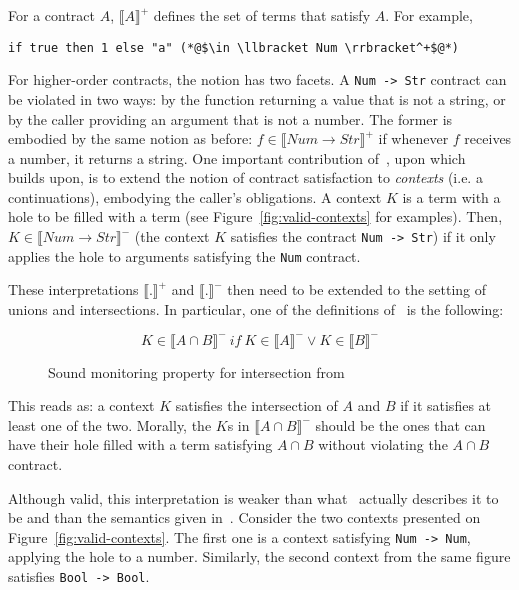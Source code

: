 \documentclass[sigplan,10pt,review,anonymous]{acmart}
\newcommand{\nickel}[1]{\lstinline[language=nickel]{#1}}
\begin{document}
For a contract $A$, $\llbracket A \rrbracket^+$ defines the set of terms that
satisfy $A$. For example,

\begin{lstlisting}[language=nickel,frame=none,numbers=none]
    if true then 1 else "a" (*@$\in \llbracket Num \rrbracket^+$@*)
\end{lstlisting}

For higher-order contracts, the notion has two facets. A \nickel{Num -> Str}
contract can be violated in two ways: by the function returning a value that is
not a string, or by the caller providing an argument that is not a number.  The
former is embodied by the same notion as before: $f \in \llbracket Num \to Str
\rrbracket^+$ if whenever $f$ receives a number, it returns a string.  One
important contribution of~\cite{KeilThiemannUnionIntersection}, upon
which~\cite{RootCauseOfBlame} builds upon, is to extend the notion of contract
satisfaction to \emph{contexts} (i.e. a continuations), embodying the caller's
obligations. A context $K$ is a term with a hole to be filled with a term (see
Figure~\ref{fig:valid-contexts} for examples). Then, $K \in \llbracket Num \to
Str \rrbracket^-$ (the context $K$ satisfies the contract \nickel{Num -> Str})
if it only applies the hole to arguments satisfying the \nickel{Num} contract.

These interpretations $\llbracket . \rrbracket^+$ and $\llbracket .
\rrbracket^-$ then need to be extended to the setting of unions and
intersections. In particular, one of the definitions of~\cite{RootCauseOfBlame}
is the following:

\begin{figure}[h]
$$ K \in \llbracket A \cap B \rrbracket^-~if~K \in \llbracket A \rrbracket^- \lor K \in \llbracket B \rrbracket^- $$
\caption{Sound monitoring property for intersection from~\cite{RootCauseOfBlame}}
\label{fig:wmw-semantics}
\end{figure}

This reads as: a context $K$ satisfies the intersection of $A$ and $B$ if it
satisfies at least one of the two. Morally, the $K$s in $\llbracket A \cap B
\rrbracket^-$  should be the ones that can have their hole filled with a term
satisfying $A \cap B$ without violating the $A \cap B$ contract.

Although valid, this interpretation is weaker than what~\cite{RootCauseOfBlame}
actually describes it to be and than the semantics given
in~\cite{KeilThiemannUnionIntersection}. Consider the two contexts presented on
Figure~\ref{fig:valid-contexts}. The first one is a context satisfying
\nickel{Num -> Num}, applying the hole to a number. Similarly, the second context
from the same figure satisfies \nickel{Bool -> Bool}.
\end{document}
